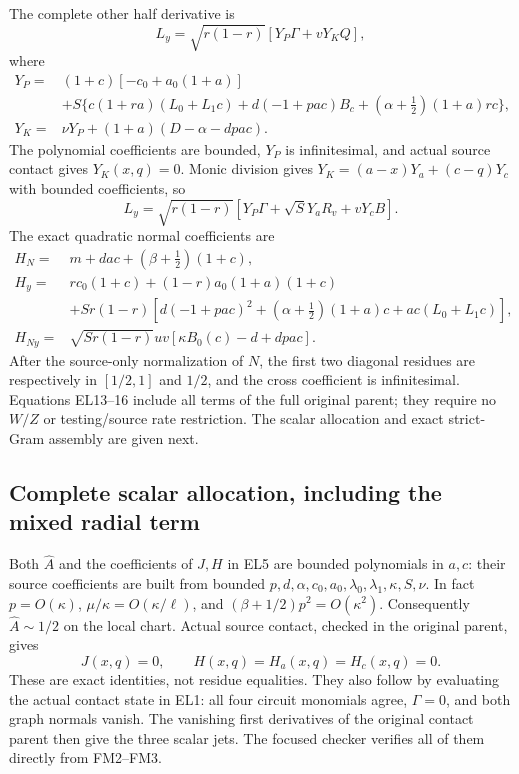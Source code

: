 The complete other half derivative is
\[
 L_y=\sqrt{r(1-r)}[Y_P\Gamma+vY_KQ],             \tag{EL14}
\]
where
\[
\begin{aligned}
 Y_P={}&(1+c)[-c_0+a_0(1+a)]\\
 &+S\{c(1+ra)(L_0+L_1c)+d(-1+pac)B_c
                   +(\alpha+\tfrac12)(1+a)rc\},\\
 Y_K={}&\nu Y_P+(1+a)(D-\alpha-dpac).
\end{aligned}
\]
The polynomial coefficients are bounded, $Y_P$ is infinitesimal,
and actual source contact gives $Y_K(x,q)=0$.  Monic division gives
$Y_K=(a-x)Y_a+(c-q)Y_c$ with bounded coefficients, so
\[
 L_y=\sqrt{r(1-r)}[Y_P\Gamma+\sqrt S Y_aR_v+vY_cB].
                                                               \tag{EL15}
\]
The exact quadratic normal coefficients are
\[
\begin{aligned}
 H_N={}&m+dac+(\beta+\tfrac12)(1+c),\\
 H_y={}&rc_0(1+c)+(1-r)a_0(1+a)(1+c)\\
 &+Sr(1-r)[d(-1+pac)^2+(\alpha+\tfrac12)(1+a)c
                         +ac(L_0+L_1c)],\\
 H_{Ny}={}&\sqrt{Sr(1-r)}uv[\kappa B_0(c)-d+dpac].
\end{aligned}                                                     \tag{EL16}
\]
After the source-only normalization of $N$, the first two diagonal
residues are respectively in $[1/2,1]$ and $1/2$, and the cross
coefficient is infinitesimal.  Equations EL13--16 include all terms
of the full original parent; they require no $W/Z$ or testing/source
rate restriction.  The scalar allocation and exact strict-Gram assembly are given next.


\subsection{Complete scalar allocation, including the mixed radial term}
Both $\widehat A$ and the coefficients of $J,H$ in EL5 are
bounded polynomials in $a,c$: their source coefficients are built
from bounded $p,d,\alpha,c_0,a_0,\lambda_0,\lambda_1,\kappa,S,\nu$.
In fact $p=O(\kappa)$,
$\mu/\kappa=O(\kappa/\ell)$, and
$(\beta+1/2)p^2=O(\kappa^2)$.
Consequently $\widehat A\sim1/2$ on the local chart.
Actual source contact, checked in the original parent, gives
\[
 J(x,q)=0,\qquad H(x,q)=H_a(x,q)=H_c(x,q)=0.        \tag{EL17}
\]
These are exact identities, not residue equalities.  They also follow
by evaluating the actual contact state in EL1: all four circuit
monomials agree, $\Gamma=0$, and both graph normals vanish.
The vanishing first derivatives of the original contact parent
then give the three scalar jets.  The focused checker verifies all
of them directly from FM2--FM3.

